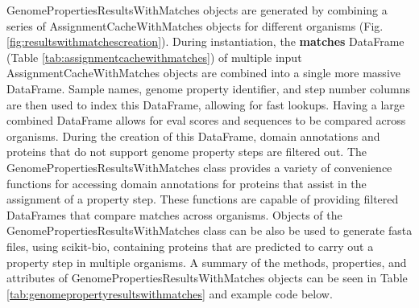 GenomePropertiesResultsWithMatches objects are generated by combining a series 
of AssignmentCacheWithMatches objects for different organisms (Fig. 
\ref{fig:resultswithmatchescreation}). During instantiation, the 
\textbf{matches} DataFrame (Table \ref{tab:assignmentcachewithmatches}) of 
multiple input AssignmentCacheWithMatches objects are combined into a single 
more massive DataFrame. Sample names, genome property identifier, and step 
number columns are then used to index this DataFrame, allowing for fast lookups. 
Having a large combined DataFrame allows for \gls{eval} scores and sequences to 
be compared across organisms. During the creation of this DataFrame, domain 
annotations and proteins that do not support genome property steps are filtered 
out. The GenomePropertiesResultsWithMatches class provides a variety of 
convenience functions for accessing domain annotations for proteins that assist 
in the assignment of a property step. These functions are capable of providing 
filtered DataFrames that compare matches across organisms. Objects of the 
GenomePropertiesResultsWithMatches class can be also be used to generate 
\gls{fasta} files, using \gls{scikit}-bio, containing proteins that are 
predicted to carry out a property step in multiple organisms. A summary of the 
methods, properties, and attributes of GenomePropertiesResultsWithMatches 
objects can be seen in Table \ref{tab:genomepropertyresultswithmatches} and 
example code below. 

